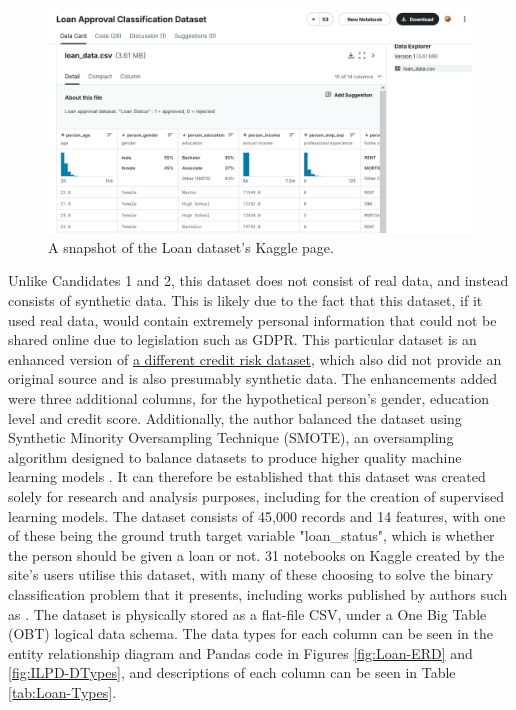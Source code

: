 \documentclass[12pt]{report}
\begin{document}
\begin{figure}[H]
    \centering
    \includegraphics[width=.75\linewidth]{Loan-Kaggle.png}
    \caption{A snapshot of the Loan dataset's Kaggle page.}
    \label{fig:Loan-Kaggle}
\end{figure}

Unlike Candidates 1 and 2, this dataset does not consist of real data, and 
instead consists of synthetic data. This is likely due to the fact that this dataset, if it used real data, would contain extremely personal 
information that could not be shared online due to legislation such as GDPR. This particular dataset is an enhanced version of \href{https://www.kaggle.com/datasets/laotse/credit-risk-dataset}{a different credit risk dataset},
which also did not provide an original source and is also presumably synthetic data. The enhancements added were three additional 
columns, for the hypothetical person's gender, education level and credit score. Additionally, the author balanced the dataset using 
Synthetic Minority Oversampling Technique (SMOTE), an oversampling algorithm designed to balance datasets to produce higher
quality machine learning models \autocite{microsoft_smote_2024}.
It can therefore be established that this dataset was created solely for research and analysis purposes, including 
for the creation of supervised learning models. The dataset consists of 45,000 records and 14 features, with 
one of these being the ground truth target variable "loan\_status", which is whether the person should be given a loan or not. 
31 notebooks on Kaggle created by the site's users utilise this dataset, with many of these choosing to solve the binary classification 
problem that it presents, including works published by authors such as \autocite{gupta_loanification_2021}. 
The dataset is physically stored as a flat-file CSV, under a One Big Table (OBT) logical data schema.
The data types for each column can be seen in the entity relationship diagram and Pandas code in Figures \ref{fig:Loan-ERD} and \ref{fig:ILPD-DTypes}, and 
descriptions of each column can be seen in Table \ref{tab:Loan-Types}.
\end{document}
